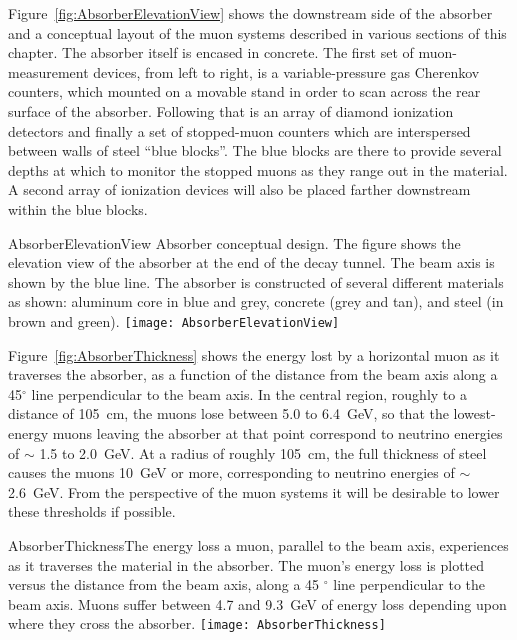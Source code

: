 Figure~\ref{fig:AbsorberElevationView} shows the downstream side of the
absorber and a conceptual layout of the muon systems described in various sections of this
chapter.  
The absorber itself is encased in concrete. The first set of
muon-measurement devices, from left to right, is a
 variable-pressure gas Cherenkov counters, which 
mounted on a movable stand in order to scan across the rear surface of the absorber.
 Following that is an
array of diamond ionization detectors and finally a set of stopped-muon 
counters which are interspersed between walls of
steel ``blue blocks''.   The blue blocks are there to provide several
depths at which to monitor the stopped muons as they range out in the
material. A second array of ionization devices will also be placed farther downstream within the blue blocks.

\begin{cdrfigure}{AbsorberElevationView}
{Absorber conceptual design. The figure shows the elevation view of the 
absorber at the end of the decay tunnel. The beam axis is shown by
the blue line. The absorber is constructed of several different 
materials as shown: aluminum core in blue and grey, concrete 
(grey and tan), and steel (in brown and green).}
\texttt{[image: AbsorberElevationView]}
\end{cdrfigure}

Figure~\ref{fig:AbsorberThickness} shows the energy lost by a
horizontal muon as it traverses the absorber, as a function of the
distance from the beam axis along a 45$^\circ$ line perpendicular to the beam axis. 
In the central region, roughly to a distance of  105~cm, the muons lose between 5.0 to 6.4~GeV, so that the
lowest-energy muons leaving the absorber at that point correspond to
neutrino energies of $\sim$ 1.5 to 2.0~GeV. At a radius of roughly 105~cm, the
full thickness of steel causes the muons 10~GeV or more,
corresponding to neutrino energies of $\sim$ 2.6~GeV. From the
perspective of the muon systems it will be desirable to lower these
thresholds if possible. 

\begin{cdrfigure}{AbsorberThickness}{The energy loss a muon, parallel to the beam axis, experiences as it traverses the material in the absorber. The muon's energy loss is plotted versus the distance from the beam axis, along a 45 $^\circ$ line perpendicular to the beam axis. Muons suffer between 4.7 and 9.3~GeV of energy loss depending upon where they cross the absorber.}
\texttt{[image: AbsorberThickness]}
\end{cdrfigure}

